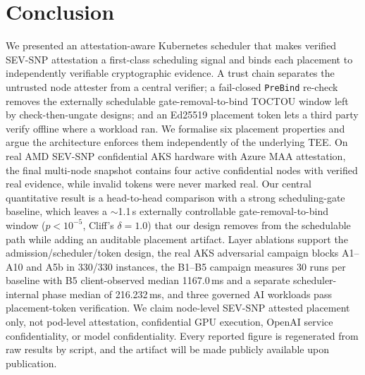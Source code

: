 \section{Conclusion}
\label{sec:conclusion}

We presented an attestation-aware Kubernetes scheduler that makes verified
SEV-SNP attestation a first-class scheduling signal and binds each placement to
independently verifiable cryptographic evidence. A trust chain separates the
untrusted node attester from a central verifier; a fail-closed \texttt{PreBind}
re-check removes the externally schedulable gate-removal-to-bind TOCTOU window
left by check-then-ungate designs; and an Ed25519 placement token lets a third
party verify offline where a workload ran. We formalise six placement properties
and argue the architecture enforces them independently of the underlying TEE. On
real AMD SEV-SNP confidential AKS hardware with Azure MAA attestation, the final
multi-node snapshot contains four active confidential nodes with verified real
evidence, while invalid tokens were never marked real. Our central quantitative
result is a head-to-head comparison with a strong scheduling-gate baseline, which
leaves a $\sim$1.1\,s externally controllable gate-removal-to-bind window
($p<10^{-5}$, Cliff's $\delta{=}1.0$) that our design removes from the schedulable
path while adding an auditable placement artifact. Layer ablations support the
admission/scheduler/token design, the real AKS adversarial campaign blocks
A1--A10 and A5b in 330/330 instances, the B1--B5 campaign measures 30 runs per baseline
with B5 client-observed median 1167.0\,ms and a separate scheduler-internal
phase median of 216.232\,ms, and three governed AI workloads pass
placement-token verification. We claim node-level SEV-SNP attested
placement only, not pod-level attestation, confidential GPU execution, OpenAI
service confidentiality, or model confidentiality. Every reported figure is
regenerated from raw results by script, and the artifact will be made
publicly available upon publication.
